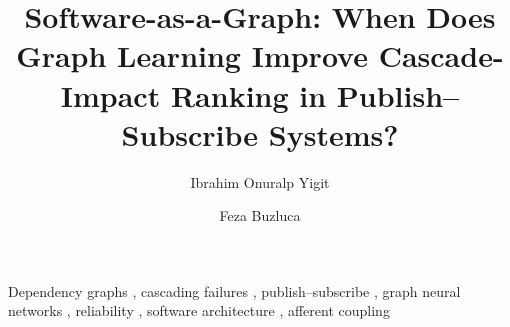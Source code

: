 \documentclass[preprint,3p]{elsarticle}
\begin{document}
\begin{frontmatter}

\title{Software-as-a-Graph: When Does Graph Learning Improve
  Cascade-Impact Ranking in Publish--Subscribe Systems?}

\author[itu,havelsan]{Ibrahim Onuralp Yigit}
\author[itu]{Feza Buzluca}


\begin{abstract}

\end{abstract}

\begin{keyword}
Dependency graphs \sep
cascading failures \sep
publish--subscribe \sep
graph neural networks \sep
reliability \sep
software architecture \sep
afferent coupling
\end{keyword}

\end{frontmatter}

\linenumbers












\renewcommand{\bibfont}{\footnotesize\linespread{0.85}\selectfont}
\setlength{\bibsep}{0pt}


\end{document}
